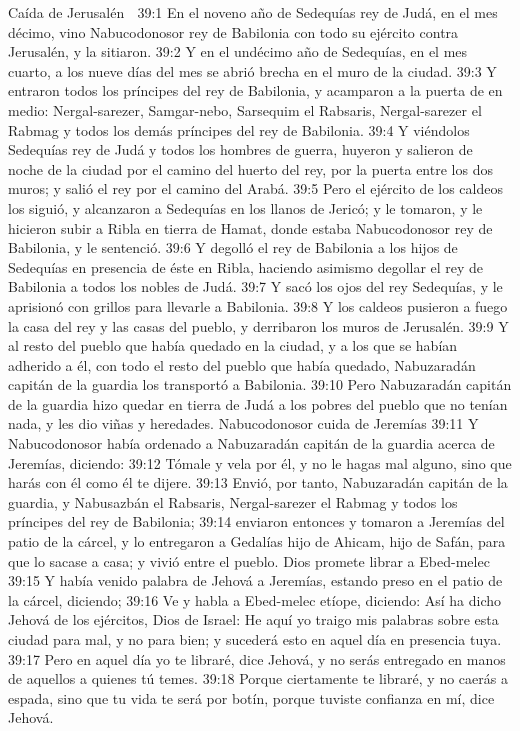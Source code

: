 Caída de Jerusalén  

39:1 En el noveno año de Sedequías rey de Judá, en el mes décimo, vino Nabucodonosor rey de Babilonia con todo su ejército contra Jerusalén, y la sitiaron.  
39:2 Y en el undécimo año de Sedequías, en el mes cuarto, a los nueve días del mes se abrió brecha en el muro de la ciudad.  
39:3 Y entraron todos los príncipes del rey de Babilonia, y acamparon a la puerta de en medio: Nergal-sarezer, Samgar-nebo, Sarsequim el Rabsaris, Nergal-sarezer el Rabmag y todos los demás príncipes del rey de Babilonia.  
39:4 Y viéndolos Sedequías rey de Judá y todos los hombres de guerra, huyeron y salieron de noche de la ciudad por el camino del huerto del rey, por la puerta entre los dos muros; y salió el rey por el camino del Arabá.  
39:5 Pero el ejército de los caldeos los siguió, y alcanzaron a Sedequías en los llanos de Jericó; y le tomaron, y le hicieron subir a Ribla en tierra de Hamat, donde estaba Nabucodonosor rey de Babilonia, y le sentenció.  
39:6 Y degolló el rey de Babilonia a los hijos de Sedequías en presencia de éste en Ribla, haciendo asimismo degollar el rey de Babilonia a todos los nobles de Judá.  
39:7 Y sacó los ojos del rey Sedequías, y le aprisionó con grillos para llevarle a Babilonia.  
39:8 Y los caldeos pusieron a fuego la casa del rey y las casas del pueblo, y derribaron los muros de Jerusalén.  
39:9 Y al resto del pueblo que había quedado en la ciudad, y a los que se habían adherido a él, con todo el resto del pueblo que había quedado, Nabuzaradán capitán de la guardia los transportó a Babilonia.  
39:10 Pero Nabuzaradán capitán de la guardia hizo quedar en tierra de Judá a los pobres del pueblo que no tenían nada, y les dio viñas y heredades.  
Nabucodonosor cuida de Jeremías  
39:11 Y Nabucodonosor había ordenado a Nabuzaradán capitán de la guardia acerca de Jeremías, diciendo:  
39:12 Tómale y vela por él, y no le hagas mal alguno, sino que harás con él como él te dijere.  
39:13 Envió, por tanto, Nabuzaradán capitán de la guardia, y Nabusazbán el Rabsaris, Nergal-sarezer el Rabmag y todos los príncipes del rey de Babilonia;  
39:14 enviaron entonces y tomaron a Jeremías del patio de la cárcel, y lo entregaron a Gedalías hijo de Ahicam, hijo de Safán, para que lo sacase a casa; y vivió entre el pueblo.  
Dios promete librar a Ebed-melec  
39:15 Y había venido palabra de Jehová a Jeremías, estando preso en el patio de la cárcel, diciendo;  
39:16 Ve y habla a Ebed-melec etíope, diciendo: Así ha dicho Jehová de los ejércitos, Dios de Israel: He aquí yo traigo mis palabras sobre esta ciudad para mal, y no para bien; y sucederá esto en aquel día en presencia tuya.  
39:17 Pero en aquel día yo te libraré, dice Jehová, y no serás entregado en manos de aquellos a quienes tú temes.  
39:18 Porque ciertamente te libraré, y no caerás a espada, sino que tu vida te será por botín, porque tuviste confianza en mí, dice Jehová.  

